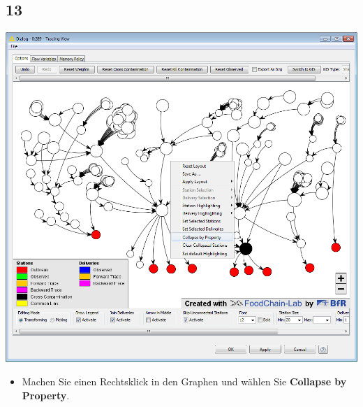 \documentclass{beamer}
\begin{document}
\subsection{13}
\begin{frame}
	\begin{center}
  		\includegraphics[height=0.6\textheight]{13.png}
	\end{center}
	\begin{itemize}
		\item Machen Sie einen Rechtsklick in den Graphen und wählen Sie \textbf{Collapse by Property}.
	\end{itemize}
\end{frame}
\end{document}
